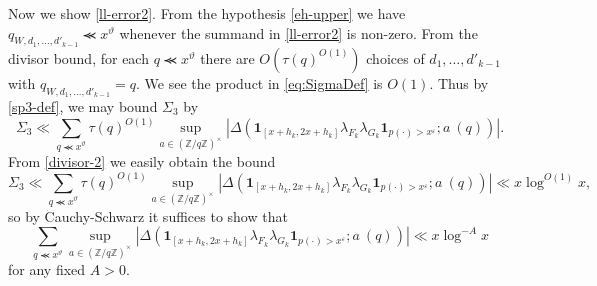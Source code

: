 \documentclass{bmcart}
\theoremstyle{plain}
\theoremstyle{definition}
\newcommand\Z{\mathbb{Z}}
\newcommand\eps{\varepsilon}
\renewcommand{\lessapprox}{\llcurly}
\newcommand{\onef}{\mathbf{1}}
\begin{document}
Now we show \eqref{ll-error2}.  From the hypothesis \eqref{eh-upper} we have $q_{W,d_1,\dots,d'_{k-1}} \lessapprox x^\vartheta$ whenever the summand in \eqref{ll-error2} is non-zero.  From the divisor bound, for each $q \lessapprox x^\vartheta$ there are $O( \tau(q)^{O(1)})$ choices of $d_1,\dots,d'_{k-1}$ with $q_{W,d_1,\dots,d'_{k-1}} = q$. We see the product in \eqref{eq:SigmaDef} is $O(1)$. Thus by \eqref{sp3-def}, we may bound $\Sigma_3$ by
$$
\Sigma_3 \ll \sum_{q \lessapprox x^\vartheta} \tau(q)^{O(1)} \sup_{a \in (\Z/q\Z)^\times} |\Delta( \onef_{[x+h_k,2x+h_k]} \lambda_{F_k} \lambda_{G_k} \onef_{p(\cdot) > x^\eps};  a\ (q))|.
$$
From \eqref{divisor-2} we easily obtain the bound
$$
\Sigma_3\ll \sum_{q \lessapprox x^\vartheta} \tau(q)^{O(1)} \sup_{a \in (\Z/q\Z)^\times} |\Delta( \onef_{[x+h_k,2x+h_k]} \lambda_{F_k} \lambda_{G_k} \onef_{p(\cdot) > x^\eps};  a\ (q))| \ll x \log^{O(1)} x,
$$
so by Cauchy-Schwarz it suffices to show that
\begin{equation}\label{local}
\sum_{q \lessapprox x^\vartheta} \sup_{a \in (\Z/q\Z)^\times} |\Delta( \onef_{[x+h_k,2x+h_k]} \lambda_{F_k} \lambda_{G_k} \onef_{p(\cdot) > x^\eps};  a\ (q))| \ll x \log^{-A} x
\end{equation}
for any fixed $A>0$.
\end{document}
